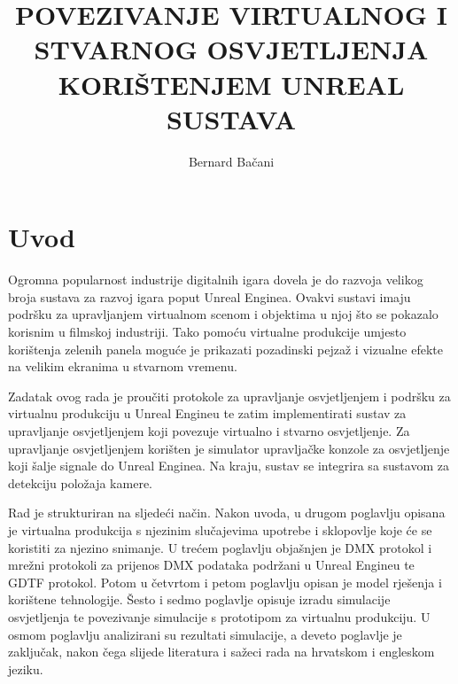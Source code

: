 \documentclass[times, utf8, zavrsni, numeric]{fer}
\begin{document}

\title{POVEZIVANJE VIRTUALNOG I STVARNOG OSVJETLJENJA KORIŠTENJEM UNREAL SUSTAVA}

\author{Bernard Bačani}

\maketitle

\izvornik


\tableofcontents

\chapter{Uvod}
Ogromna popularnost industrije digitalnih igara dovela je do razvoja velikog broja sustava za razvoj igara poput Unreal Enginea. Ovakvi sustavi imaju podršku za upravljanjem virtualnom scenom i objektima u njoj što se pokazalo korisnim u filmskoj industriji. Tako pomoću virtualne produkcije umjesto korištenja zelenih panela moguće je prikazati pozadinski pejzaž i vizualne efekte na velikim ekranima u stvarnom vremenu. \newline

Zadatak ovog rada je proučiti protokole za upravljanje osvjetljenjem i podršku za virtualnu produkciju u Unreal Engineu te zatim implementirati sustav za upravljanje osvjetljenjem koji povezuje virtualno i stvarno osvjetljenje. Za upravljanje osvjetljenjem korišten je simulator upravljačke konzole za osvjetljenje koji šalje signale do Unreal Enginea. Na kraju, sustav se integrira sa sustavom za detekciju položaja kamere. \newline

Rad je strukturiran na sljedeći način. Nakon uvoda, u drugom poglavlju opisana je virtualna produkcija s njezinim slučajevima upotrebe i sklopovlje koje će se koristiti za njezino snimanje. U trećem poglavlju objašnjen je DMX protokol i mrežni protokoli za prijenos DMX podataka podržani u Unreal Engineu te GDTF protokol. Potom u četvrtom i petom poglavlju opisan je model rješenja i korištene tehnologije. Šesto i sedmo poglavlje opisuje izradu simulacije osvjetljenja te povezivanje simulacije s prototipom za virtualnu produkciju. U osmom poglavlju analizirani su rezultati simulacije, a deveto poglavlje je zaključak, nakon čega slijede literatura i sažeci rada na hrvatskom i engleskom jeziku.
\end{document}
